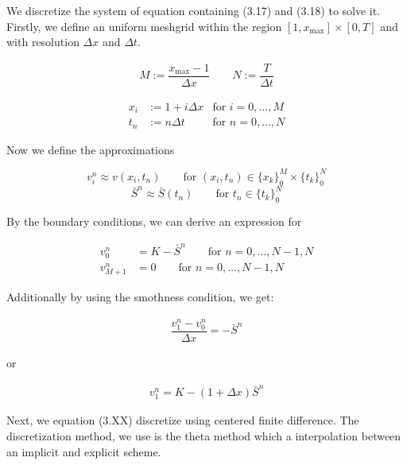 We discretize the system of equation containing (3.17) and (3.18) to solve it. 
Firstly, we define an uniform meshgrid within the region $[1, x_\text{max}]\times [0, T]$ and 
with resolution $\Delta x$ and $\Delta t$.

\begin{align*}
    M := \dfrac{x_{\text{max}} - 1}{\Delta x}
    \qquad
    N := \dfrac{T}{\Delta t}
\end{align*}

\begin{align*}
   & & x_i &:= 1 + i{\Delta x} &\text{for $i = 0,\dots,M$} & & \\ 
   & & t_n &:= n{\Delta t} &\text{for $n = 0,\dots,N$} & &
\end{align*}

Now we define the approximations

\begin{equation}
    v^{n}_{i} \approx v(x_{i}, t_{n}) \qquad \text{for $(x_{i}, t_{n}) \in \{x_k\}^{M}_{0} \times \{t_k\}^{N}_{0}$} 
\end{equation}
\begin{equation}
    \bar{S}^{n} \approx \bar{S}(t_{n}) \qquad \text{for $t_{n} \in \{t_k\}^{N}_{0}$} 
\end{equation}

By the boundary conditions, we can derive an expression for

\begin{align}
    v^{n}_{0} &= K - \bar{S}^{n} \qquad \text{for $n = 0, \dots, N - 1, N$} \\
    v^{n}_{M+1} &= 0 \qquad \text{for $n = 0, \dots, N - 1, N$}
\end{align}

Additionally by using the smothness condition, we get:

\begin{align}
    \dfrac{v^{n}_{1} - v^{n}_0}{\Delta x} = -\bar{S}^{n}
\end{align}

or 

\begin{align}
    v^{n}_{1}= K - (1 + {\Delta x})\bar{S}^{n}
\end{align}

Next, we equation (3.XX) discretize using centered finite difference. The discretization
method, we use is the theta method which a interpolation between an implicit and explicit scheme.

